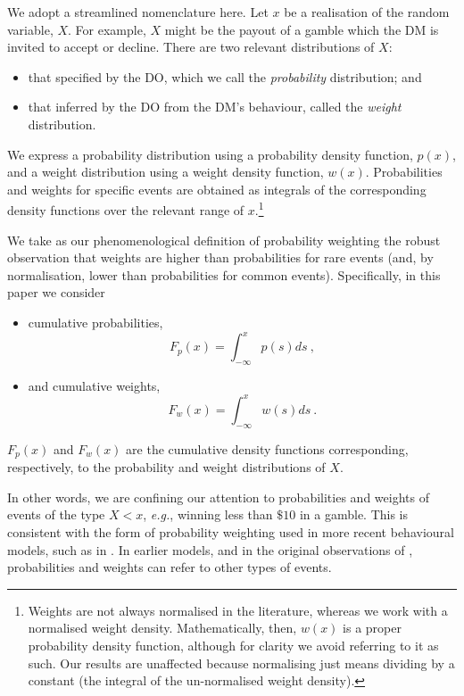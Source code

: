 \documentclass[12pt,letter,timesnewroman]{article}
\newcommand{\bi}{\begin{itemize}}
\newcommand{\ei}{\end{itemize}}
\newcommand{\elabel}[1]{\label{eq:#1}}
\newcommand{\eg}{\textit{e.g.}}
\newcommand{\be}{\begin{equation}}
\newcommand{\ee}{\end{equation}}
\begin{document}
We adopt a streamlined nomenclature here. Let $x$ be a realisation of the random variable, $X$. For example, $X$ might be the payout of a gamble which the DM is invited to accept or decline. There are two relevant distributions of $X$:
\bi
\item that specified by the DO, which we call the \textit{probability} distribution; and
\item that inferred by the DO from the DM's behaviour, called the \textit{weight} distribution.
\ei
We express a probability distribution using a probability density function, $p(x)$, and a weight distribution using a weight density function, $w(x)$. Probabilities and weights for specific events are obtained as integrals of the corresponding density functions over the relevant range of $x$.\footnote{Weights are not always normalised in the literature, whereas we work with a normalised weight density. Mathematically, then, $w(x)$ is a proper probability density function, although for clarity we avoid referring to it as such. Our results are unaffected because normalising just means dividing by a constant (the integral of the un-normalised weight density).}

We take as our phenomenological definition of probability weighting the robust observation that weights are higher than probabilities for rare events (and, by normalisation, lower than probabilities for common events). Specifically, in this paper we consider
\bi
\item cumulative probabilities,
\be
\elabel{DO_CDF}
F_p(x)=\int_{-\infty}^x p(s) ds~,
\ee
\item and cumulative weights,
\be
\elabel{DM_CDF}
F_w(x)=\int_{-\infty}^x w(s) ds~.
\ee
\ei
$F_p(x)$ and $F_w(x)$ are the cumulative density functions corresponding, respectively, to the probability and weight distributions of $X$.

In other words, we are confining our attention to probabilities and weights of events of the type $X<x$, \eg, winning less than $\$10$ in a gamble. This is consistent with the form of probability weighting used in more recent behavioural models, such as in \textcite{TverskyKahneman1992}. In earlier models, and in the original observations of \textcite{PrestonBaratta1948}, probabilities and weights can refer to other types of events.
\end{document}
